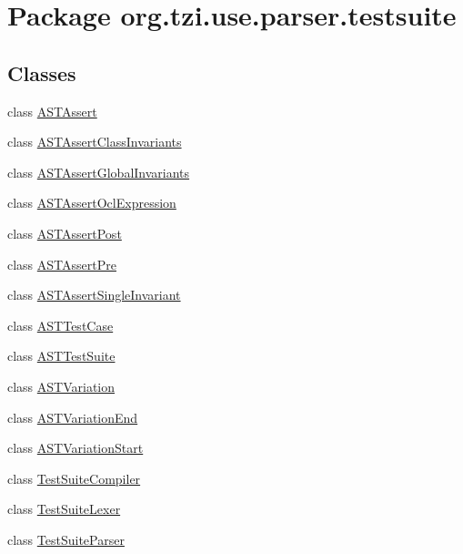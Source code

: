 \hypertarget{namespaceorg_1_1tzi_1_1use_1_1parser_1_1testsuite}{\section{Package org.\-tzi.\-use.\-parser.\-testsuite}
\label{namespaceorg_1_1tzi_1_1use_1_1parser_1_1testsuite}
}
\subsection*{Classes}
\begin{DoxyCompactItemize}
\item 
class \hyperlink{classorg_1_1tzi_1_1use_1_1parser_1_1testsuite_1_1_a_s_t_assert}{A\-S\-T\-Assert}
\item 
class \hyperlink{classorg_1_1tzi_1_1use_1_1parser_1_1testsuite_1_1_a_s_t_assert_class_invariants}{A\-S\-T\-Assert\-Class\-Invariants}
\item 
class \hyperlink{classorg_1_1tzi_1_1use_1_1parser_1_1testsuite_1_1_a_s_t_assert_global_invariants}{A\-S\-T\-Assert\-Global\-Invariants}
\item 
class \hyperlink{classorg_1_1tzi_1_1use_1_1parser_1_1testsuite_1_1_a_s_t_assert_ocl_expression}{A\-S\-T\-Assert\-Ocl\-Expression}
\item 
class \hyperlink{classorg_1_1tzi_1_1use_1_1parser_1_1testsuite_1_1_a_s_t_assert_post}{A\-S\-T\-Assert\-Post}
\item 
class \hyperlink{classorg_1_1tzi_1_1use_1_1parser_1_1testsuite_1_1_a_s_t_assert_pre}{A\-S\-T\-Assert\-Pre}
\item 
class \hyperlink{classorg_1_1tzi_1_1use_1_1parser_1_1testsuite_1_1_a_s_t_assert_single_invariant}{A\-S\-T\-Assert\-Single\-Invariant}
\item 
class \hyperlink{classorg_1_1tzi_1_1use_1_1parser_1_1testsuite_1_1_a_s_t_test_case}{A\-S\-T\-Test\-Case}
\item 
class \hyperlink{classorg_1_1tzi_1_1use_1_1parser_1_1testsuite_1_1_a_s_t_test_suite}{A\-S\-T\-Test\-Suite}
\item 
class \hyperlink{classorg_1_1tzi_1_1use_1_1parser_1_1testsuite_1_1_a_s_t_variation}{A\-S\-T\-Variation}
\item 
class \hyperlink{classorg_1_1tzi_1_1use_1_1parser_1_1testsuite_1_1_a_s_t_variation_end}{A\-S\-T\-Variation\-End}
\item 
class \hyperlink{classorg_1_1tzi_1_1use_1_1parser_1_1testsuite_1_1_a_s_t_variation_start}{A\-S\-T\-Variation\-Start}
\item 
class \hyperlink{classorg_1_1tzi_1_1use_1_1parser_1_1testsuite_1_1_test_suite_compiler}{Test\-Suite\-Compiler}
\item 
class \hyperlink{classorg_1_1tzi_1_1use_1_1parser_1_1testsuite_1_1_test_suite_lexer}{Test\-Suite\-Lexer}
\item 
class \hyperlink{classorg_1_1tzi_1_1use_1_1parser_1_1testsuite_1_1_test_suite_parser}{Test\-Suite\-Parser}
\end{DoxyCompactItemize}

